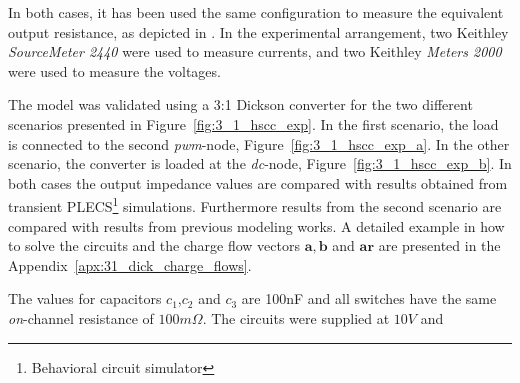


In both cases, it has been used the same configuration to measure the equivalent output resistance, as depicted in . In the experimental arrangement, two Keithley\textsuperscript{\textregistered} \emph{SourceMeter 2440} were used to measure currents, and two Keithley\textsuperscript{\textregistered} \emph{Meters 2000} were used to measure the voltages.

%



The model was validated using a 3:1 Dickson converter for the two different scenarios presented in Figure~\ref{fig:3_1_hscc_exp}. In the first scenario, the load is connected to the second \emph{pwm}-node, Figure~\ref{fig:3_1_hscc_exp_a}. In the other scenario, the converter is loaded at the \emph{dc}-node, Figure~\ref{fig:3_1_hscc_exp_b}. In both cases the output impedance values are compared with results obtained from transient PLECS\footnote{\label{fn:PLECS}Behavioral circuit simulator} simulations. Furthermore results from the second scenario are compared with results from previous modeling works.  A detailed example in how to solve the circuits and the charge flow vectors $\mathbf{a}, \mathbf{b} $ and $\mathbf{ar}$ are presented in the Appendix~\ref{apx:31_dick_charge_flows}.


%

The values for capacitors $c_1$,$c_2$ and $c_3$ are 100nF and all switches have the same \emph{on}-channel resistance of $100m\Omega$. The circuits were supplied at $10V$ and 